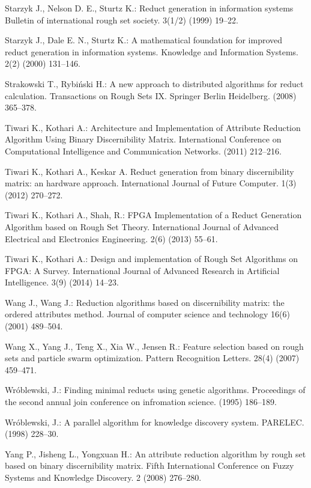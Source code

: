 \documentclass[11pt]{article}   %
\begin{document}
\begin{thebibliography}{}
	Starzyk J., Nelson D. E., Sturtz K.:
	Reduct generation in information systems
	Bulletin of international rough set society. 3(1/2) (1999) 19--22.

	Starzyk J., Dale E. N., Sturtz K.:
	A mathematical foundation for improved reduct generation in information systems.
	Knowledge and Information Systems. 2(2) (2000) 131--146.

	Strakowski T.,  Rybi\'nski H.:
	A new approach to distributed algorithms for reduct calculation.
	Transactions on Rough Sets IX. Springer Berlin Heidelberg. (2008) 365--378.

	Tiwari K., Kothari A.:
	Architecture and Implementation of Attribute Reduction Algorithm Using Binary Discernibility Matrix.
	International Conference on Computational Intelligence and Communication Networks. (2011) 212--216.

	Tiwari K., Kothari A., Keskar A.  
	Reduct generation from binary discernibility matrix: an hardware approach. 
	International Journal of Future Computer. 1(3) (2012) 270--272.

	Tiwari K., Kothari A., Shah, R.:
	FPGA Implementation of a Reduct Generation Algorithm based on Rough Set Theory. 
	International Journal of Advanced Electrical and Electronics Engineering. 2(6) (2013) 55--61.

	Tiwari K., Kothari A.:
	Design and implementation of Rough Set Algorithms on FPGA: A Survey.
	International Journal of Advanced Research in Artificial Intelligence. 3(9) (2014) 14--23.
		
	Wang J., Wang J.:
	Reduction algorithms based on discernibility matrix: the ordered attributes method.
	Journal of computer science and technology 16(6) (2001) 489--504.

	Wang X., Yang J., Teng X., Xia W., Jensen R.:
	Feature selection based on rough sets and particle swarm optimization.
	Pattern Recognition Letters. 28(4) (2007) 459--471.
	
	Wr\'oblewski, J.: 
	Finding minimal reducts using genetic algorithms.
	Proceedings of the second annual join conference on infromation science. (1995) 186--189.

	Wr\'oblewski, J.: 
	A parallel algorithm for knowledge discovery system.
	PARELEC. (1998) 228--30.

	Yang P., Jisheng L., Yongxuan H.:
	An attribute reduction algorithm by rough set based on binary discernibility matrix.
	Fifth International Conference on Fuzzy Systems and Knowledge Discovery. 2 (2008) 276--280.
	

\end{thebibliography}
\end{document}
